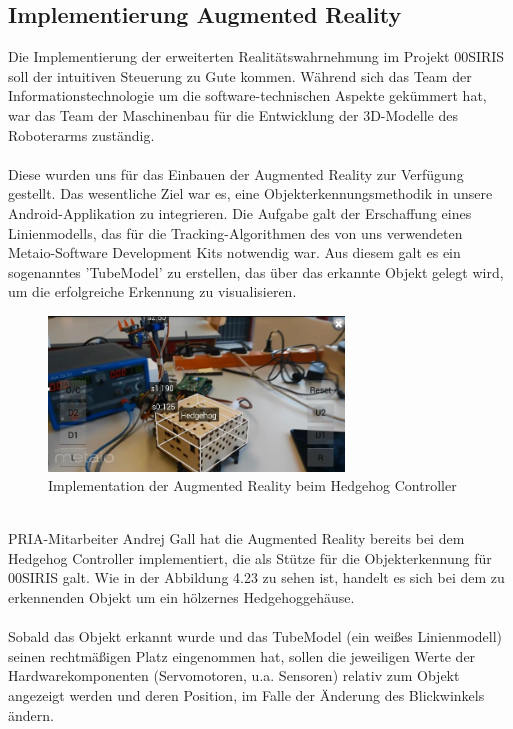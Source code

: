 \documentclass[11pt, a4paper]{article}
\begin{document}
\newpage
\subsection{Implementierung Augmented Reality}
Die Implementierung der erweiterten Realit\"atswahrnehmung im Projekt 00SIRIS soll der intuitiven Steuerung zu Gute kommen. W\"ahrend sich das Team der Informationstechnologie um die software-technischen Aspekte gek\"ummert hat, war das Team der Maschinenbau f\"ur die Entwicklung der 3D-Modelle des Roboterarms zust\"andig. \\ \\
Diese wurden uns f\"ur das Einbauen der Augmented Reality zur Verf\"ugung gestellt. Das wesentliche Ziel war es, eine Objekterkennungsmethodik in unsere Android-Applikation zu integrieren. Die Aufgabe galt der Erschaffung eines Linienmodells, das f\"ur die Tracking-Algorithmen des von uns verwendeten Metaio-Software Development Kits notwendig war. Aus diesem galt es ein sogenanntes 'TubeModel' zu erstellen, das \"uber das erkannte Objekt gelegt wird, um die erfolgreiche Erkennung zu visualisieren.
\begin{figure}[h!]
		\centering
		\includegraphics[width=0.7\textwidth]{graphics/augmented-reality/aug-andrej}
		\caption{Implementation der Augmented Reality beim Hedgehog Controller}
		\label{fig:hedgehog-controller-andrej}
\end{figure} \\
PRIA-Mitarbeiter Andrej Gall hat die Augmented Reality bereits bei dem Hedgehog Controller implementiert, die als Stütze für die Objekterkennung für 00SIRIS galt. Wie in der Abbildung 4.23 zu sehen ist, handelt es sich bei dem zu erkennenden Objekt um ein h\"olzernes Hedgehoggeh\"ause. \\ \\ 
\noindent Sobald das Objekt erkannt wurde und das TubeModel (ein wei\ss{}es Linienmodell) seinen rechtm\"a\ss{}igen Platz eingenommen hat, sollen die jeweiligen Werte der Hardwarekomponenten (Servomotoren, u.a. Sensoren) relativ zum Objekt angezeigt werden und deren Position, im Falle der \"Anderung des Blickwinkels \"andern. \\ \\
\end{document}
